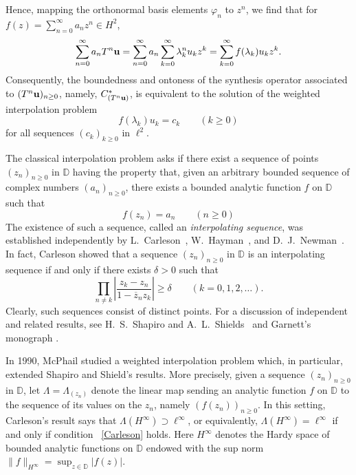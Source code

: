 \documentclass[11pt]{amsart}
\theoremstyle{definition}
\theoremstyle{remark}
\numberwithin{equation}{section}
\def\phi{\varphi}
\newcommand{\uu}{\textnormal{\textbf{u}} }
\begin{document}
{\smallskip

\noindent Hence, mapping the orthonormal basis elements $\phi_n$ to $z^n$, we find that for $f(z)=\sum_{n=0}^\infty a_n z^n\in H^2$,
\[
\sum_{n=0}^\infty  a_n T^n \uu = \sum_{n=0}^\infty a_n \sum_{k=0}^\infty   \lambda_k^n u_k z^k
= \sum_{k=0}^\infty f(\lambda_k)u_k z^k.
\]
Consequently, the boundedness and ontoness of the synthesis operator associated to $(T^n \uu)_{n \ge 0}$, namely, $C_{(T^n \uu)}^*$, is equivalent to the solution of the weighted interpolation problem
\begin{equation}\label{weighted interpolation}
f(\lambda_k)u_k= c_k \qquad (k\geq 0)
\end{equation}
for all sequences $(c_k)_{k\geq 0}$ in $\ell^2$.

\smallskip

The classical interpolation problem asks if there exist a sequence of points $(z_n)_{n\geq 0}$ in $\mathbb{D}$ having the property that, given an arbitrary bounded sequence of complex numbers $(a_n)_{n\geq 0}$, there exists a bounded analytic function $f$ on $\mathbb{D}$ such that
\begin{equation*}
f(z_n) = a_n \qquad (n\geq 0)
\end{equation*}
The existence of such a sequence, called an \emph{interpolating sequence}, was
established independently by L.~Carleson~\cite{Carleson}, W.~Hayman~\cite{Hayman},
and D.~J.~Newman~\cite{Newman}. In fact, Carleson showed that a sequence
$(z_n)_{n\geq 0}$ in $\mathbb{D}$ is an interpolating sequence if and only if there exists
$\delta > 0$ such that
\begin{equation}\label{Carleson}
\prod_{n \neq k}
\left|
\frac{z_k - z_n}{1 - \overline{z}_n z_k}
\right|
\ge \delta
\qquad (k = 0,1,2,\ldots).
\end{equation}
Clearly, such sequences consist of distinct points. For a discussion of independent and related results, see H.~S.~Shapiro and
A.~L.~Shields~\cite{ShapiroShields} and Garnett's monograph \cite{Garnett}.

\smallskip


In 1990, McPhail \cite{mcphail} studied a weighted interpolation problem which, in particular, extended Shapiro and Shield's results. More precisely,  given a sequence $(z_n)_{n\geq 0}$ in $\mathbb{D}$, let $\Lambda = \Lambda_{(z_n)}$ denote the linear map sending an analytic function
$f$ on $\mathbb{D}$ to the sequence of its values on the $z_n$, namely
$(f(z_n))_{n\geq 0}$. In this setting, Carleson’s result says that
$\Lambda (H^\infty) \supset \ell^\infty $, or equivalently, $\Lambda (H^\infty) = \ell^\infty$
if and only if condition~ \eqref{Carleson} holds. Here $H^\infty$ denotes the Hardy space of bounded analytic functions on $\mathbb{D}$ endowed with the sup norm
$\|f\|_{H^\infty}= \sup_{z \in \mathbb{D}} |f(z)|$.


}
\end{document}
